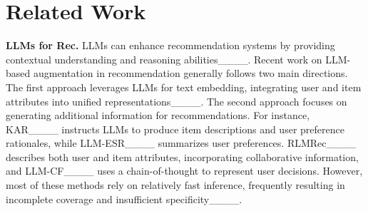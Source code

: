 \section{Related Work}

\textbf{LLMs for Rec.} LLMs can enhance recommendation systems by providing contextual understanding and reasoning abilities____. Recent work on LLM-based augmentation in recommendation generally follows two main directions. The first approach leverages LLMs for text embedding, integrating user and item attributes into unified representations____. The second approach focuses on generating additional information for recommendations. For instance, KAR____ instructs LLMs to produce item descriptions and user preference rationales, while LLM-ESR____ summarizes user preferences. RLMRec____ describes both user and item attributes, incorporating collaborative information, and LLM-CF____ uses a chain-of-thought to represent user decisions. However, most of these methods rely on relatively fast inference, frequently resulting in incomplete coverage and insufficient specificity____.

